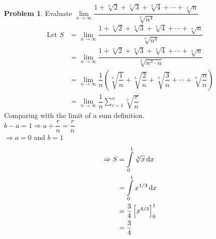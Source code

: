 \documentclass[14]{article}
\theoremstyle{definition}
\newtheorem{prob}{Problem}
\theoremstyle{case}
\begin{document}
\begin{prob}
Evaluate $\lim\limits_{n \to \infty} \dfrac{1 + \sqrt[3]{2} + \sqrt[3]{3} + \sqrt[3]{4} + \cdots + \sqrt[3]{n}}{\sqrt[3]{n^4}}$
\begin{align*}
\text{Let } S &= \lim\limits_{n \to \infty} \dfrac{1 + \sqrt[3]{2} + \sqrt[3]{3} + \sqrt[3]{4} + \cdots + \sqrt[3]{n}}{\sqrt[3]{n^4}}\\
&= \lim\limits_{n \to \infty} \dfrac{1 + \sqrt[3]{2} + \sqrt[3]{3} + \sqrt[3]{4} + \cdots + \sqrt[3]{n}}{\sqrt[3]{n^3 \cdot n}}\\
&= \lim\limits_{n \to \infty} \dfrac1n \left( \sqrt[3]{\dfrac1n} + \sqrt[3]{\dfrac2n} + \sqrt[3]{\dfrac3n} + \cdots + \sqrt[3]{\dfrac{n}n} \right)\\
&= \lim\limits_{n \to \infty} \dfrac1n \sum\limits_{r=1}^n \sqrt[3]{\dfrac{r}{n}}
\end{align*}
Comparing with the limit of a sum definition.\\
$b - a = 1 \Rightarrow a + \dfrac{r}{n} = \dfrac{r}{n}$\\
$\Rightarrow a = 0$ and $b = 1$
\begin{align*}
\Rightarrow S &= \int\limits_0^1 \sqrt[3]{x} \dif x\\
&= \int\limits_0^1 x^{1/3} \dif x\\
&= \dfrac34 \left[ x^{4/3} \right]_0^1\\
&= \dfrac34
\end{align*}
\end{prob}
\pagebreak
\end{document}
